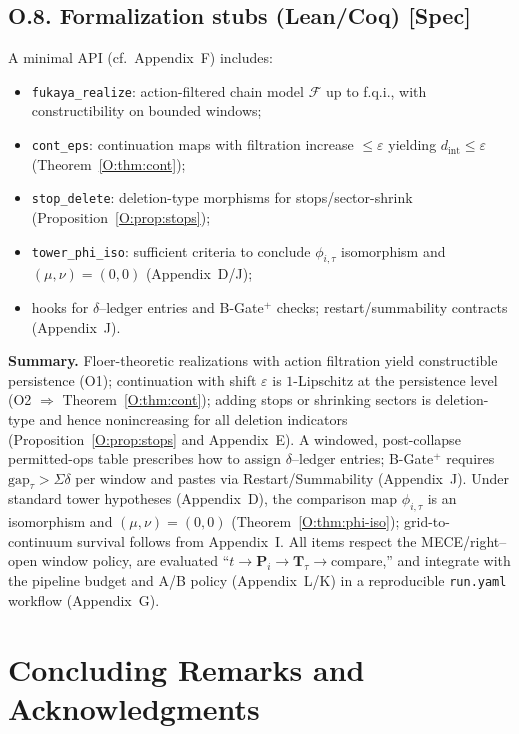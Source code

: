 \documentclass[11pt]{article}
\DeclareRobustCommand{\hyp}{\nobreakdash-}
\numberwithin{equation}{section}
\theoremstyle{definition}
\begin{document}
\subsection*{O.8. Formalization stubs (Lean/Coq) [Spec]}
A minimal API (cf.\ Appendix~F) includes:
\begin{itemize}\itemsep0.25em
  \item \texttt{fukaya\_realize}: action-filtered chain model \(\mathcal{F}\) up to f.q.i., with constructibility on bounded windows;
  \item \texttt{cont\_eps}: continuation maps with filtration increase \(\le\varepsilon\) yielding \(d_{\mathrm{int}}\le\varepsilon\) (Theorem~\ref{O:thm:cont});
  \item \texttt{stop\_delete}: deletion-type morphisms for stops/sector-shrink (Proposition~\ref{O:prop:stops});
  \item \texttt{tower\_phi\_iso}: sufficient criteria to conclude \(\phi_{i,\tau}\) isomorphism and \((\mu,\nu)=(0,0)\) (Appendix~D/J);
  \item hooks for \(\delta\)–ledger entries and B-Gate\(^{+}\) checks; restart/summability contracts (Appendix~J).
\end{itemize}

\medskip
\noindent\textbf{Summary.}
Floer-theoretic realizations with action filtration yield constructible persistence (\textup{O1}); continuation with shift \(\varepsilon\) is \(1\)\hyp Lipschitz at the persistence level (\textup{O2} \(\Rightarrow\) Theorem~\ref{O:thm:cont}); adding stops or shrinking sectors is deletion-type and hence nonincreasing for all deletion indicators (Proposition~\ref{O:prop:stops} and Appendix~E).
A windowed, post-collapse permitted-ops table prescribes how to assign \(\delta\)–ledger entries; B-Gate\(^{+}\) requires \(\mathrm{gap}_\tau>\Sigma\delta\) per window and pastes via Restart/Summability (Appendix~J).
Under standard tower hypotheses (Appendix~D), the comparison map \(\phi_{i,\tau}\) is an isomorphism and \((\mu,\nu)=(0,0)\) (Theorem~\ref{O:thm:phi-iso}); grid-to-continuum survival follows from Appendix~I.
All items respect the MECE/right–open window policy, are evaluated “\(t\)\(\to\)\(\mathbf{P}_i\)\(\to\)\(\mathbf{T}_\tau\)\(\to\)compare,” and integrate with the pipeline budget and A/B policy (Appendix~L/K) in a reproducible \texttt{run.yaml} workflow (Appendix~G).



\section*{Concluding Remarks and Acknowledgments}
\end{document}
